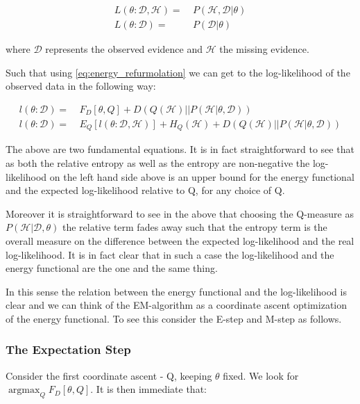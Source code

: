 \documentclass[11pt]{article}
\begin{document}
\begin{article}
\begin{align} \label{eq:likelihood_particle}
L (\theta: \mathscr{D}, \mathscr{H}) =& \  P (\mathscr{H}, \mathscr{D}| \theta)\\
L (\theta: \mathscr{D}) =& \ P (\mathscr{D}| \theta)
\end{align}

where \(\mathscr{D}\) represents the observed evidence and
\(\mathscr{H}\) the missing evidence.

Such that using \ref{eq:energy_refurmolation} we can get to the
log-likelihood of the observed data in the following way:

\begin{align} \label{eq:likelihood_energy_functional_relation}
l (\theta: \mathscr{D}) =& \  F_D[\theta, Q] + D (Q (\mathscr{H}) || P (\mathscr{H}| \theta, \mathscr{D})) \\
l (\theta: \mathscr{D}) =& \  E_Q[l (\theta: \mathscr{D}, \mathscr{H})]+ H_Q (\mathscr {H}) + D (Q (\mathscr{H}) || P (\mathscr{H}| \theta, \mathscr{D}))
\end{align}

The above are two fundamental equations. It is in fact
straightforward to see that as both the relative entropy as well as
the entropy are non-negative the log-likelihood on the left hand
side above is an upper bound for the energy functional and the expected
log-likelihood relative to Q, for any choice of Q.

Moreover it is straightforward to see in the above that choosing the
Q-measure as \(P (\mathscr{H}| \mathscr{D}, \theta)\) the relative term
fades away such that the entropy term is the overall measure on the
difference between the expected log-likelihood and the real
log-likelihood. It is in fact clear that in such a case the
log-likelihood and the energy functional are the one and the same
thing.

In this sense the relation between the energy functional and the
log-likelihood is clear and we can think of the EM-algorithm as a
coordinate ascent optimization of the energy functional. To see this
consider the E-step and M-step as follows.

\subsubsection{The Expectation Step}
\label{sec:org310d511}

Consider the first coordinate ascent - Q, keeping \(\theta\)
fixed. We look for \(\operatorname*{argmax}_{Q} F_D[\theta, Q]\). It
is then immediate that:


\end{article}
\end{document}
